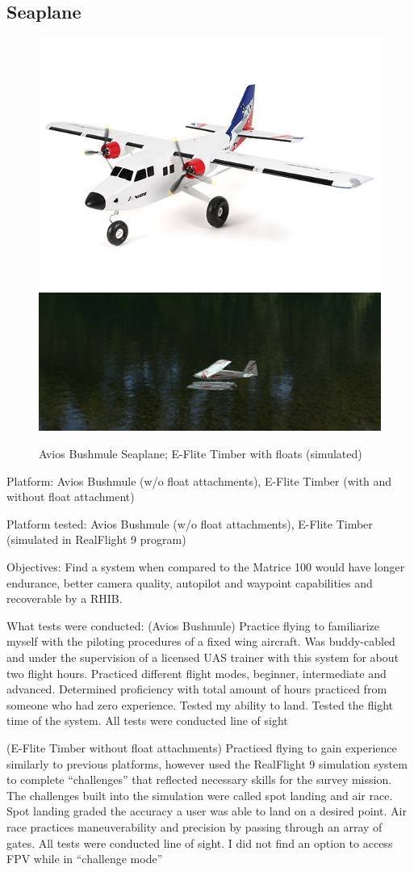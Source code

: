 \subsection{Seaplane}
\begin{figure}
\begin{center}
\includegraphics[width=0.49\columnwidth]{figures/survey4a.png}
\includegraphics[width=0.49\columnwidth]{figures/survey4b.png}
\end{center}
\caption{Avios Bushmule Seaplane; E-Flite Timber with floats (simulated)}
\end{figure}

Platform: Avios Bushmule (w/o float attachments), E-Flite Timber (with and without float attachment)

Platform tested: Avios Bushmule  (w/o float attachments), E-Flite Timber (simulated in RealFlight 9 program)

Objectives: Find a system when compared to the Matrice 100 would have longer endurance, better camera quality, autopilot and waypoint capabilities and recoverable by a RHIB.

What tests were conducted: (Avios Bushmule) Practice flying to familiarize myself with the piloting procedures of a fixed wing aircraft. Was buddy-cabled and under the supervision of a licensed UAS trainer with this system for about two flight hours. Practiced different flight modes, beginner, intermediate and advanced. Determined proficiency with total amount of hours practiced from someone who had zero experience. Tested my ability to land. Tested the flight time of the system. All tests were conducted line of sight

(E-Flite Timber without float attachments) Practiced flying to gain experience similarly to previous platforms, however used the RealFlight 9 simulation system to complete ``challenges'' that reflected necessary skills for the survey mission. The challenges built into the simulation were called spot landing and air race. Spot landing graded the accuracy a user was able to land on a desired point. Air race practices maneuverability and precision by passing through an array of gates. All tests were conducted line of sight. I did not find an option to access FPV while in ``challenge mode''


